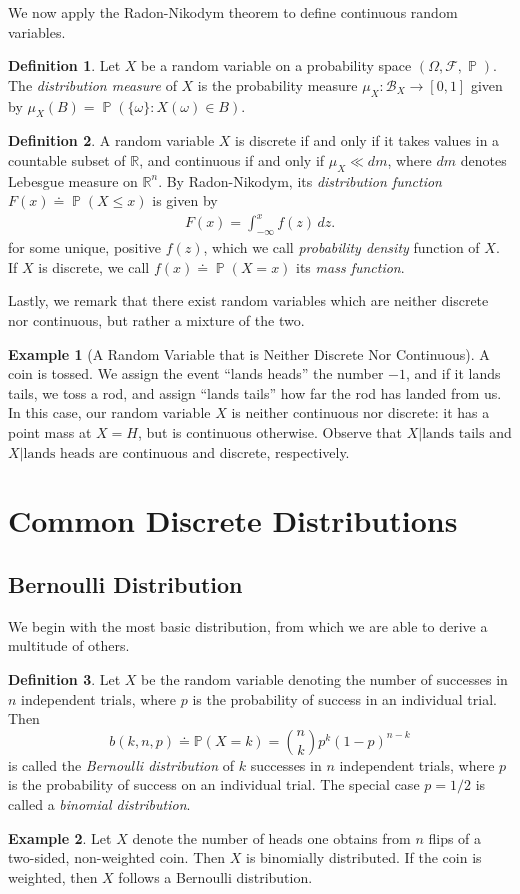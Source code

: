\documentclass[12pt]{amsbook}
\newcommand{\rr}{\mathbb{R}}
\newcommand{\filter}{\mathcal{F}}
\newcommand{\borel}{\mathcal{B}}
\DeclareMathOperator{\prob}{\mathbb{P}}
\theoremstyle{plain}
\theoremstyle{definition}
\newtheorem*{definition}{Definition}
\newtheorem*{example}{Example}
\theoremstyle{remark}
\numberwithin{equation}{section}  %
\numberwithin{equation}{section}  %
\begin{document}
We now apply the Radon-Nikodym theorem to define continuous random variables.
\begin{definition}
	Let $X$ be a random variable on a probability space $(\Omega, \filter, 
	\prob)$. 
	The \emph{distribution measure} of $X$ is the probability measure $\mu_X:
	\borel_X \to [0,1]$ given by $\mu_X(B) = \prob(\{\omega\}: X(\omega) \in 
	B)$.
\end{definition}
\begin{definition}
	A random variable $X$ is discrete if and only if it takes values in a 
	countable
	subset of $\rr$, and continuous if and only if $\mu_X \ll dm$, where $dm$
	denotes Lebesgue measure on $\rr^n$. By Radon-Nikodym, its 
	\emph{distribution
	function} $F(x) \doteq \prob(X \le x)$ is given by
	\begin{align*}
		F(x) = \int_{-\infty}^x f(z) \,dz.
	\end{align*}
	for some unique, positive $f(z)$, which we call \emph{probability density}
	function of $X$.
	If $X$ is discrete, we call
	$f(x) \doteq \prob(X = x)$ its \emph{mass function}.
\end{definition}
Lastly, we remark that there exist random variables which are neither
discrete nor continuous, but rather a mixture of the two.
\begin{example}[A Random Variable that is Neither Discrete Nor Continuous]
	A coin is tossed. We assign the event ``lands heads'' the number $-1$, and 
	if it lands tails, we toss a rod, and assign ``lands tails'' how far the 
	rod has
	landed from us. In this case, our random variable $X$ is neither continuous 
	nor
	discrete: it has a point mass at $X = H$, but is continuous otherwise.
	Observe that $X | \text{lands tails}$ and $X | \text{lands heads}$ are
	continuous and discrete, respectively.
\end{example}
\section{Common Discrete Distributions}
\subsection{Bernoulli Distribution}
We begin with the most basic distribution, from which
we are able to derive a multitude of others.
\begin{definition}
	Let $X$ be the random variable denoting the number of successes
	in $n$ independent trials, where $p$ is the probability of success in
	an individual trial. Then
	\begin{equation*}
		b(k, n, p) \doteq \mathbb{P}(X = k) = \binom{n}{k} p^k {(1 - p)}^{n-k}
	\end{equation*}
	is called the \emph{Bernoulli distribution} of $k$ successes
	in $n$ independent trials, where $p$ is the probability of success on an
	individual trial. The special case
	$p = 1/2$ is called a \emph{binomial distribution}.
\end{definition}
\begin{example}
	Let $X$ denote the number of heads one obtains from $n$ flips of a
	two-sided, non-weighted coin. Then $X$ is binomially distributed.
	If the coin is weighted, then $X$ follows a Bernoulli distribution.
\end{example}
\end{document}

